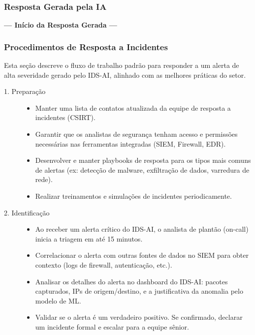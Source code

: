 \documentclass[a4paper,12pt]{article}
\begin{document}
\subsubsection{Resposta Gerada pela IA}
\begin{center}
    \textbf{--- Início da Resposta Gerada ---}
\end{center}

\subsubsection*{Procedimentos de Resposta a Incidentes}
Esta seção descreve o fluxo de trabalho padrão para responder a um alerta de alta severidade gerado pelo IDS-AI, alinhado com as melhores práticas do setor.

\begin{description}
    \item[1. Preparação]
    \begin{itemize}
        \item Manter uma lista de contatos atualizada da equipe de resposta a incidentes (CSIRT).
        \item Garantir que os analistas de segurança tenham acesso e permissões necessárias nas ferramentas integradas (SIEM, Firewall, EDR).
        \item Desenvolver e manter playbooks de resposta para os tipos mais comuns de alertas (ex: detecção de malware, exfiltração de dados, varredura de rede).
        \item Realizar treinamentos e simulações de incidentes periodicamente.
    \end{itemize}

    \item[2. Identificação]
    \begin{itemize}
        \item Ao receber um alerta crítico do IDS-AI, o analista de plantão (on-call) inicia a triagem em até 15 minutos.
        \item Correlacionar o alerta com outras fontes de dados no SIEM para obter contexto (logs de firewall, autenticação, etc.).
        \item Analisar os detalhes do alerta no dashboard do IDS-AI: pacotes capturados, IPs de origem/destino, e a justificativa da anomalia pelo modelo de ML.
        \item Validar se o alerta é um verdadeiro positivo. Se confirmado, declarar um incidente formal e escalar para a equipe sênior.
    \end{itemize}
    

\end{description}
\end{document}
